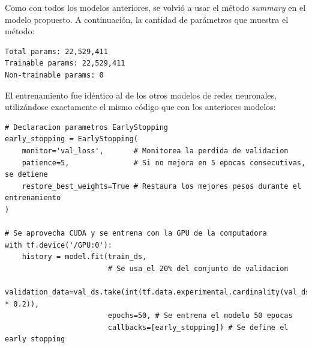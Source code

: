 Como con todos los modelos anteriores, se volvió a usar el método \textit{summary} en el modelo propuesto. A continuación, la cantidad de parámetros que muestra el método: \\


\begin{lstlisting}[caption={Salida del método summary aplicado a la CNN propuesta}]
Total params: 22,529,411
Trainable params: 22,529,411
Non-trainable params: 0
\end{lstlisting}

El entrenamiento fue idéntico al de los otros modelos de redes neuronales, utilizándose exactamente el mismo código que con los anteriores modelos: \\


\begin{lstlisting}[caption={Código entrenamiento de la CNN propuesta}]
# Declaracion parametros EarlyStopping
early_stopping = EarlyStopping(
    monitor='val_loss',       # Monitorea la perdida de validacion
    patience=5,               # Si no mejora en 5 epocas consecutivas, se detiene
    restore_best_weights=True # Restaura los mejores pesos durante el entrenamiento
)

# Se aprovecha CUDA y se entrena con la GPU de la computadora
with tf.device('/GPU:0'):
    history = model.fit(train_ds, 
                        # Se usa el 20% del conjunto de validacion
                        validation_data=val_ds.take(int(tf.data.experimental.cardinality(val_ds).numpy() * 0.2)), 
                        epochs=50, # Se entrena el modelo 50 epocas
                        callbacks=[early_stopping]) # Se define el early stopping
\end{lstlisting}